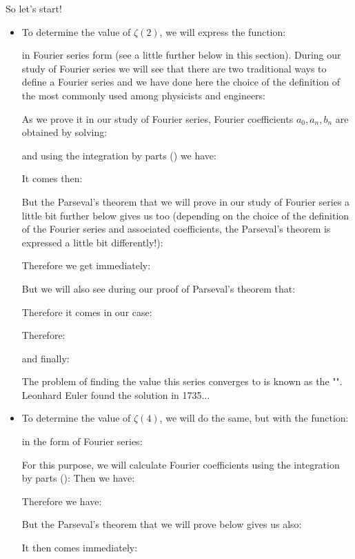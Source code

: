 	So let's start!
	
	\begin{itemize}
		\item To determine the value of $\zeta (2)$, we will express the function:
		
		in Fourier series form (see a little further below in this section). During our study of Fourier series we will see that there are two traditional ways to define a Fourier series and we have done here the choice of the definition of the most commonly used among physicists and engineers:
		
		As we prove it in our study of Fourier series, Fourier coefficients $a_0,a_n,b_n$ are obtained by solving:
		
		and using the integration by parts () we have:
		
		It comes then:
		
		But the Parseval's theorem that we will prove in our study of Fourier series a little bit further below gives us too (depending on the choice of the definition of the Fourier series and associated coefficients, the Parseval's theorem is expressed a little bit differently!):
		
		Therefore we get immediately:
		
		But we will also see during our proof of Parseval's theorem that:
		
		Therefore it comes in our case:
		
		Therefore:
		
		and finally:
		
		The problem of finding the value this series converges to is known as the "". Leonhard Euler found the solution in 1735...
		
		\item To determine the value of $\zeta(4)$, we will do the same, but with the function:
		
		in the form of Fourier series:
		
		For this purpose, we will calculate Fourier coefficients using the integration by parts ():
		Then we have:
		
		Therefore we have:
		
		But the Parseval's theorem that we will prove below gives us also:
		
		It then comes immediately:
		

\end{itemize}
